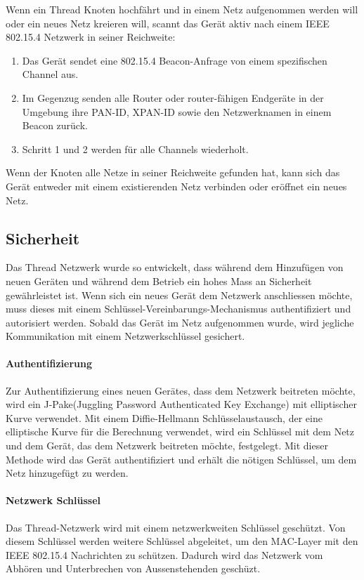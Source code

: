 Wenn ein Thread Knoten hochfährt und in einem Netz aufgenommen werden will oder ein neues Netz kreieren will, scannt das Gerät aktiv nach einem IEEE 802.15.4 Netzwerk in seiner Reichweite:

\begin{enumerate}
	\item Das Gerät sendet eine 802.15.4 Beacon-Anfrage von einem spezifischen Channel aus.
	\item Im Gegenzug senden alle Router oder router-fähigen Endgeräte in der Umgebung ihre PAN-ID, XPAN-ID sowie den Netzwerknamen in einem Beacon zurück.
	\item Schritt 1 und 2 werden für alle Channels wiederholt.
\end{enumerate}

Wenn der Knoten alle Netze in seiner Reichweite gefunden hat, kann sich das Gerät entweder mit einem existierenden Netz verbinden oder eröffnet ein neues Netz.

\newpage

\subsection{Sicherheit}\label{subsec:Sicherheit}
Das Thread Netzwerk wurde so entwickelt, dass während dem Hinzufügen von neuen Geräten und während dem Betrieb ein hohes Mass an Sicherheit gewährleistet ist. Wenn sich ein neues Gerät dem Netzwerk anschliessen möchte, muss dieses mit einem Schlüssel-Vereinbarungs-Mechanismus authentifiziert und autorisiert werden. Sobald das Gerät im Netz aufgenommen wurde, wird jegliche Kommunikation mit einem Netzwerkschlüssel gesichert.

\paragraph{Authentifizierung}
Zur Authentifizierung eines neuen Gerätes, dass dem Netzwerk beitreten möchte, wird ein J-Pake(Juggling Password Authenticated Key Exchange) mit elliptischer Kurve verwendet. Mit einem Diffie-Hellmann Schlüsselaustausch, der eine elliptische Kurve für die Berechnung verwendet, wird ein Schlüssel mit dem Netz und dem Gerät, das dem Netzwerk beitreten möchte, festgelegt. Mit dieser Methode wird das Gerät authentifiziert und erhält die nötigen Schlüssel, um dem Netz hinzugefügt zu werden. \cite[Seite 1-4]{thread_group_inc_thread_2017}

\paragraph{Netzwerk Schlüssel}
Das Thread-Netzwerk wird mit einem netzwerkweiten Schlüssel geschützt. Von diesem Schlüssel werden weitere Schlüssel abgeleitet, um den MAC-Layer mit den IEEE 802.15.4 Nachrichten zu schützen. Dadurch wird das Netzwerk vom Abhören und Unterbrechen von Aussenstehenden geschüzt.\cite[Seite 1-5]{thread_group_inc_thread_2017}

